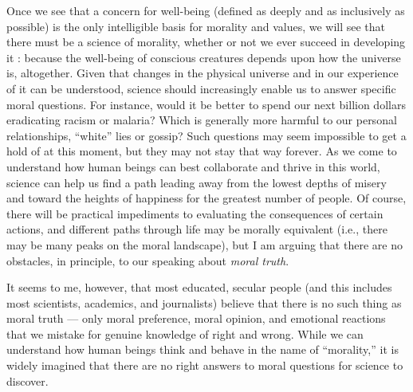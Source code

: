 \documentclass[a4paper,14pt]{extbook}
\begin{document}
Once we see that a concern for well-being (defined as deeply and as inclusively as possible) is the only intelligible basis for morality and values, we will see that there must be a science of morality, whether or not we ever succeed in developing it :
because the well-being of conscious creatures depends upon how the universe is, altogether.
Given that changes in the physical universe and in our experience of it can be understood, science should increasingly enable us to answer specific moral questions.
For instance, would it be better to spend our next billion dollars eradicating racism or malaria?
Which is generally more harmful to our personal relationships, ``white'' lies or gossip?
Such questions may seem impossible to get a hold of at this moment, but they may not stay that way forever.
As we come to understand how human beings can best collaborate and thrive in this world, science can help us find a path leading away from the lowest depths of misery and toward the heights of happiness for the greatest number of people.
Of course, there will be practical impediments to evaluating the consequences of certain actions, and different paths through life may be morally equivalent (i.e., there may be many peaks on the moral landscape), but I am arguing that there are no obstacles, in principle, to our speaking about \textit{moral truth}.

It seems to me, however, that most educated, secular people (and this includes most scientists, academics, and journalists) believe that there is no such thing as moral truth --- only moral preference, moral opinion, and emotional reactions that we mistake for genuine knowledge of right and wrong.
While we can understand how human beings think and behave in the name of ``morality,'' it is widely imagined that there are no right answers to moral questions for science to discover.
\end{document}

